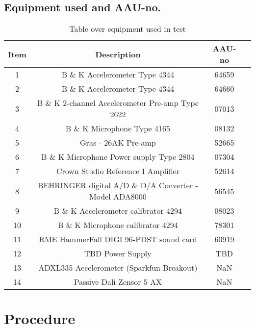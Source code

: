 \subsection*{Equipment used and AAU-no.}

\begin{table}[H]
\centering
{}
\begin{tabular}{S[table-format=1]ccc} \toprule
    {Item} & {Description} & {AAU-no} \\       &  B \& K Accelerometer Type 4344  & 64659   \\ 
    2      &  B \& K Accelerometer Type 4344  & 64660   \\ 
    3      &  B \& K 2-channel Accelerometer Pre-amp Type 2622  & 07013   \\
    4      &  B \& K Microphone Type 4165  & 08132   \\
    5      &  Gras - 26AK Pre-amp & 52665   \\
    6      &  B \& K Microphone Power supply Type 2804  & 07304   \\
    7      &  Crown Studio Reference I Amplifier & 52614   \\
    8      &  BEHRINGER digital A/D \& D/A Converter - Model ADA8000   & 56545   \\
    9      &  B \& K Accelerometer calibrator 4294 & 08023   \\
    10     &  B \& K Microphone calibrator 4294 & 78301   \\
    11     &  RME HammerFall DIGI 96-PDST sound card & 60919  \\
    12     &  TBD Power Supply & TBD  \\
    13     &  ADXL335 Accelerometer (Sparkfun Breakout) & NaN  \\
    14     &  Passive Dali Zensor 5 AX & NaN  \\ \bottomrule 
\end{tabular}
\caption{Table over equipment used in test}
\label{tab:UsedEquipment2}
\end{table}



\section{Procedure}\label{sec:SpeakerTestProcedure}


